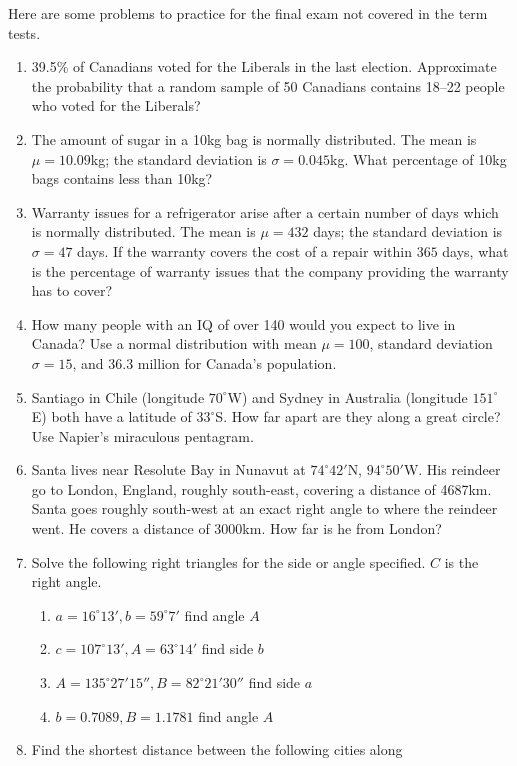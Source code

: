 \documentclass[11pt]{article}
\begin{document}
Here are some problems to practice for the final exam not covered in
the term tests.

\begin{enumerate}
\item 39.5\% of Canadians voted for the Liberals in the last election.
  Approximate the probability that a random sample of 50 Canadians
  contains 18--22 people who voted for the Liberals?
\item The amount of sugar in a 10kg bag is normally distributed. The
  mean is $\mu=10.09$kg; the standard deviation is $\sigma=0.045$kg.
  What percentage of 10kg bags contains less than 10kg?
\item Warranty issues for a refrigerator arise after a certain number
  of days which is normally distributed. The mean is $\mu=432$ days;
  the standard deviation is $\sigma=47$ days. If the warranty covers
  the cost of a repair within $365$ days, what is the percentage of
  warranty issues that the company providing the warranty has to
  cover?
\item How many people with an IQ of over 140 would you expect to live
  in Canada? Use a normal distribution with mean $\mu=100$, standard
  deviation $\sigma=15$, and 36.3 million for Canada's population.
\item Santiago in Chile (longitude $70^{\circ}$W) and Sydney in
  Australia (longitude $151^{\circ}$E) both have a latitude of
  $33^{\circ}$S. How far apart are they along a great circle? Use
  Napier's miraculous pentagram.
\item Santa lives near Resolute Bay in Nunavut at $74^{\circ}42'$N,
  $94^{\circ}50'$W. His reindeer go to London, England, roughly
  south-east, covering a distance of 4687km. Santa goes roughly
  south-west at an exact right angle to where the reindeer went. He
  covers a distance of 3000km. How far is he from London?
\item Solve the following right triangles for the side or angle
  specified. $C$ is the right angle.
  \begin{enumerate}
  \item $a=16^{\circ}13',b=59^{\circ}7'$ find angle $A$
  \item $c=107^{\circ}13',A=63^{\circ}14'$ find side $b$
  \item $A=135^{\circ}27'15'',B=82^{\circ}21'30''$ find side $a$
  \item $b=0.7089,B=1.1781$ find angle $A$
  \end{enumerate}
\item Find the shortest distance between the following cities along

\end{enumerate}
\end{document}
